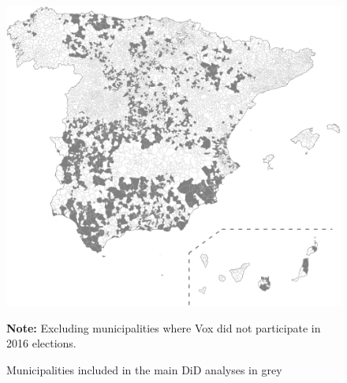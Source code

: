 \documentclass[12pt, titlepage]{article}
\begin{document}
\begin{figure}[htb!]
\centering

  \includegraphics[width = \textwidth]{img/map}

  \caption{Municipalities included in the main DiD analyses in grey}\label{fig:map}
  
    \vspace{5pt}
    
    \parbox[t]{0.8\textwidth}{\footnotesize{\textbf{Note:} Excluding municipalities where Vox did not participate in 2016 elections.}}

\end{figure}
\end{document}
